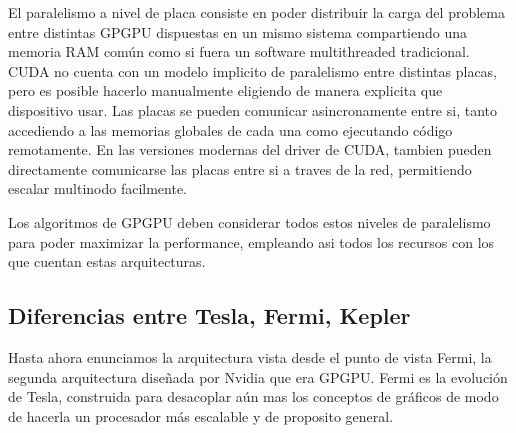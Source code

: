 El paralelismo a nivel de placa consiste en poder distribuir la carga del problema entre distintas
GPGPU dispuestas en un mismo sistema compartiendo una memoria RAM com\'un como si fuera un software
multithreaded tradicional. CUDA no cuenta con un modelo implicito de paralelismo entre distintas placas,
pero es posible hacerlo manualmente eligiendo de manera explicita que dispositivo usar. Las placas
se pueden comunicar asincronamente entre si, tanto accediendo a las memorias globales de cada una
como ejecutando c\'odigo remotamente. En las versiones modernas del driver de CUDA, tambien pueden
directamente comunicarse las placas entre si a traves de la red, permitiendo escalar multinodo facilmente.

Los algoritmos de GPGPU deben considerar todos estos niveles de paralelismo para poder maximizar la
performance, empleando asi todos los recursos con los que cuentan estas arquitecturas.

\subsection{Diferencias entre Tesla, Fermi, Kepler}

Hasta ahora enunciamos la arquitectura vista desde el punto de vista Fermi, la segunda
arquitectura dise\~nada por Nvidia que era GPGPU. Fermi es la evoluci\'on de Tesla,
construida para desacoplar a\'un mas los conceptos de gr\'aficos de modo de hacerla
un procesador m\'as escalable y de proposito general.


